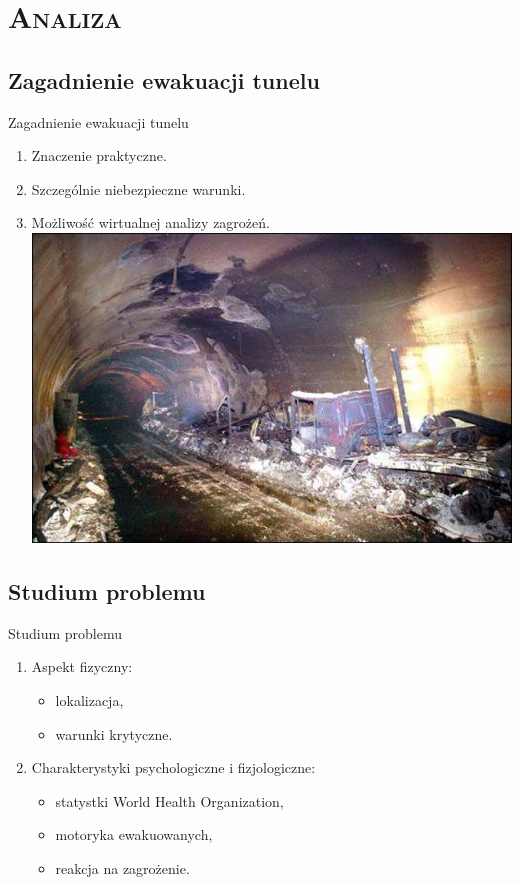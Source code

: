 \section{\scshape Analiza}


\subsection{Zagadnienie ewakuacji tunelu}
\begin{frame}{Zagadnienie ewakuacji tunelu}

\begin{enumerate}
  \item Znaczenie praktyczne.
  \item Szczególnie niebezpieczne warunki.
  \item Możliwość wirtualnej analizy zagrożeń.
  \includegraphics[scale = 0.27]{mont_blanc}
\end{enumerate}

\end{frame}


\subsection{Studium problemu}
\begin{frame}{Studium problemu}

\begin{enumerate}
  \item Aspekt fizyczny:
  \begin{itemize}
    \item lokalizacja,
    \item warunki krytyczne.
  \end{itemize}
  \item Charakterystyki psychologiczne i fizjologiczne:
  \begin{itemize}
    \item statystki World Health Organization,
    \item motoryka ewakuowanych,
    \item reakcja na zagrożenie.
  \end{itemize}
\end{enumerate}

\end{frame}